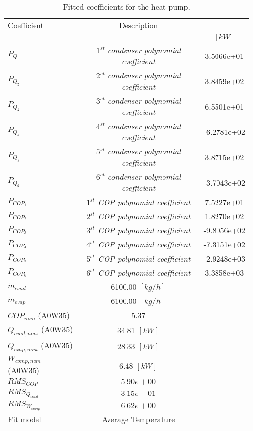 \documentclass[english]{SPFShortReport}
\author{Dani Carbonell}
\begin{document}
\begin{table}[!ht]
\begin{small}
\caption{Fitted coefficients for the heat pump.}
\begin{center}
\resizebox{12cm}{!} 
{
\begin{tabular}{l | c c } 
\hline
\hline
Coefficient &Description & \\ 
 & &$[kW]$\\ 
\hline
$P_{Q_{1}}$ & \emph{$1^{st}$ condenser polynomial coefficient}  & 3.5066e+01    \\ 
$P_{Q_{2}}$ & \emph{$2^{st}$ condenser polynomial coefficient}  & 3.8459e+02    \\ 
$P_{Q_{3}}$ & \emph{$3^{st}$ condenser polynomial coefficient}  & 6.5501e+01    \\ 
$P_{Q_{4}}$ & \emph{$4^{st}$ condenser polynomial coefficient}  & -6.2781e+02    \\ 
$P_{Q_{5}}$ & \emph{$5^{st}$ condenser polynomial coefficient}  & 3.8715e+02    \\ 
$P_{Q_{6}}$ & \emph{$6^{st}$ condenser polynomial coefficient}  & -3.7043e+02    \\ 
\hline
$P_{COP_{1}}$ & \emph{$1^{st}$ COP polynomial coefficient}  & 7.5227e+01    \\ 
$P_{COP_{2}}$ & \emph{$2^{st}$ COP polynomial coefficient}  & 1.8270e+02    \\ 
$P_{COP_{3}}$ & \emph{$3^{st}$ COP polynomial coefficient}  & -9.8056e+02    \\ 
$P_{COP_{4}}$ & \emph{$4^{st}$ COP polynomial coefficient}  & -7.3151e+02    \\ 
$P_{COP_{5}}$ & \emph{$5^{st}$ COP polynomial coefficient}  & -2.9248e+03    \\ 
$P_{COP_{6}}$ & \emph{$6^{st}$ COP polynomial coefficient}  & 3.3858e+03    \\ 
\hline
$\dot m_{cond}$ & 6100.00 $[kg/h]$ \\ 
$\dot m_{evap}$ & 6100.00 $[kg/h]$ \\ 
\hline
$COP_{nom}$ (A0W35)& 5.37 \\ 
$Q_{cond,nom}$ (A0W35)& 34.81 $[kW]$\\ 
$Q_{evap,nom}$ (A0W35)& 28.33 $[kW]$\\ 
$W_{comp,nom}$ (A0W35)& 6.48 $[kW]$\\ 
\hline
 $RMS_{COP}$ & $5.90e+00$ \\ 
 $RMS_{Q_{cond}}$ & $3.15e-01$ \\ 
 $RMS_{W_{comp}}$ & $6.62e+00$ \\ 
\hline
Fit model & Average Temperature\\ 
\hline
\hline
\end{tabular}
}
\label{CoefTable}
\end{center}
\end{small}
\end{table}
\end{document}
